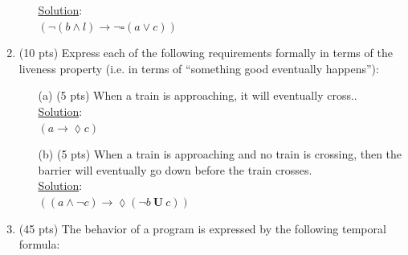 \documentclass[12pt]{article}
\begin{document}
\begin{enumerate}
\begin{itemize}
\noindent \underline{Solution}:\\
\square $(\lnot(b \wedge l) \rightarrow \lnot \square(a \vee c)) $
\end{itemize}
\item (10 pts) Express each of the following requirements formally in terms of the liveness
property (i.e. in terms of “something good eventually happens”):
\begin{itemize}
\item[(a)] (5 pts) When a train is approaching, it will eventually cross.. \\
\noindent \underline{Solution}:\\
\square $(a \rightarrow \lozenge c) $
\item[(b)] (5 pts) When a train is approaching and no train is crossing, then the barrier will
eventually go down before the train crosses. \\
\noindent \underline{Solution}:\\
\square $((a \wedge \lnot c) \rightarrow \lozenge(\lnot b \ \textbf{U} \ c)) $
\end{itemize}
\item (45 pts) The behavior of a program is expressed by the following temporal formula:\\


\end{enumerate}
\end{document}
